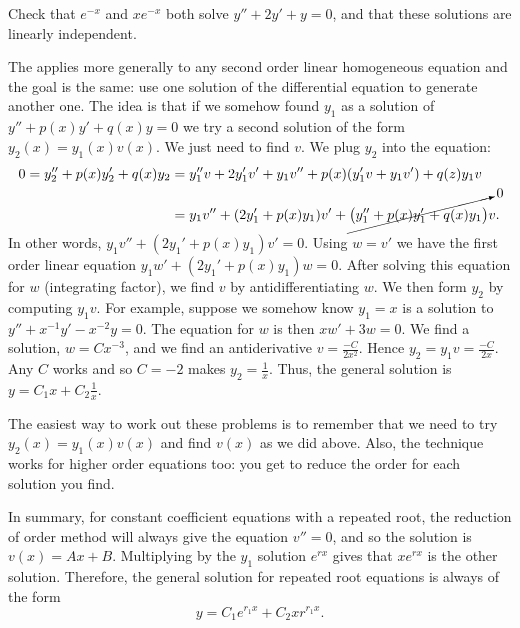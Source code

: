\documentclass{ximera}
\begin{document}
\begin{exercise}
    Check that $e^{-x}$ and $xe^{-x}$ both solve $y'' + 2y' + y = 0$, and that these solutions are linearly independent.
\end{exercise}

The \emph{} applies more generally to any second order linear homogeneous equation and the goal is the same: use one solution of the differential equation to generate another one.  The idea is that if we somehow found $y_1$ as a solution of $y'' + p(x) y' + q(x) y = 0$ we try a second solution of the form $y_2(x) = y_1(x) v(x)$. We just need to find $v$.  We plug $y_2$ into the equation:
\begin{equation*}
    \begin{split}
        0 = y_2'' + p(x) y_2' + q(x) y_2 & = y_1'' v + 2 y_1' v' + y_1 v'' + p(x) ( y_1' v + y_1 v' ) + q(z) y_1 v \\
        & = y_1 v'' + (2 y_1' + p(x) y_1) v' + \cancelto{0}{\bigl( y_1'' + p(x) y_1' + q(x) y_1 \bigr)} v .
    \end{split}
\end{equation*}
In other words, $y_1 v'' + (2 y_1' + p(x) y_1) v' = 0$.  Using $w = v'$ we have the first order linear equation $y_1 w' + (2 y_1' + p(x) y_1) w = 0$.  After solving this equation for $w$ (integrating factor), we find $v$ by antidifferentiating $w$.  We then form $y_2$ by computing $y_1 v$.  For example, suppose we somehow know $y_1 = x$ is a solution to $y''+x^{-1}y'-x^{-2} y=0$. The equation for $w$ is then $xw' + 3 w = 0$.  We find a solution, $w = Cx^{-3}$, and we find an antiderivative $v = \frac{-C}{2x^2}$. Hence $y_2 = y_1 v = \frac{-C}{2x}$. Any $C$ works and so $C=-2$ makes $y_2 = \frac{1}{x}$.  Thus, the general solution is $y = C_1 x + C_2\frac{1}{x}$.

The easiest way to work out these problems is to remember that we need to try $y_2(x) = y_1(x) v(x)$ and find $v(x)$ as we did above.  Also, the technique works for higher order equations too: you get to reduce the order for each solution you find. 

In summary, for constant coefficient equations with a repeated root, the reduction of order method will always give the equation $v'' = 0$, and so the solution is $v(x) = Ax + B$. Multiplying by the $y_1$ solution $e^{rx}$ gives that $xe^{rx}$ is the other solution. Therefore, the general solution for repeated root equations is always of the form
\begin{equation*}
    y = C_1e^{r_1x} + C_2xr^{r_1x}.
\end{equation*}
\end{document}
